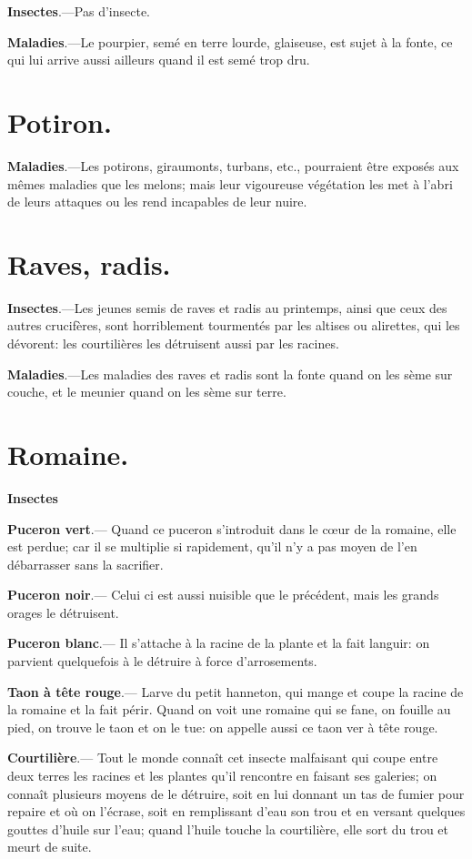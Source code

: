 \documentclass[10pt,a4paper]{book}
\begin{document}
\textbf{Insectes}.---Pas d'insecte.

\textbf{Maladies}.---Le pourpier, semé en terre lourde, glaiseuse, est sujet à la fonte, ce qui lui arrive aussi ailleurs quand il est semé trop dru.

\section{Potiron.}

\textbf{Maladies}.---Les potirons, giraumonts, turbans, etc., pourraient être exposés aux mêmes maladies que les melons; mais leur vigoureuse végétation les met à l'abri de leurs attaques ou les rend incapables de leur nuire.

\section{Raves, radis.}

\textbf{Insectes}.---Les jeunes semis de raves et radis au printemps, ainsi que ceux des autres crucifères, sont horriblement tourmentés par les altises ou alirettes, qui les dévorent: les courtilières les détruisent aussi par les racines.

\textbf{Maladies}.---Les maladies des raves et radis sont la fonte quand on les sème sur couche, et le meunier quand on les sème sur terre.

\section{Romaine.}

\textbf{Insectes}

\textbf{Puceron vert}.--- Quand ce puceron s'introduit dans le cœur de la romaine, elle est perdue; car il se multiplie si rapidement, qu'il n'y a pas moyen de l'en débarrasser sans la sacrifier.

\textbf{Puceron noir}.--- Celui ci est aussi nuisible que le précédent, mais les grands orages le détruisent.

\textbf{Puceron blanc}.--- Il s'attache à la racine de la plante et la fait languir: on parvient quelquefois à le détruire à force d'arrosements.

\textbf{Taon à tête rouge}.--- Larve du petit hanneton, qui mange et coupe la racine de la romaine et la fait périr. Quand on voit une romaine qui se fane, on fouille au pied, on trouve le taon et on le tue: on appelle aussi ce taon ver à tête rouge.

\textbf{Courtilière}.--- Tout le monde connaît cet insecte malfaisant qui coupe entre deux terres les racines et les plantes qu'il rencontre en faisant ses galeries; on connaît plusieurs moyens de le détruire, soit en lui donnant un tas de fumier pour repaire et où on l'écrase, soit en remplissant d'eau son trou et en versant quelques gouttes d'huile sur l'eau; quand l'huile touche la courtilière, elle sort du trou et meurt de suite.
\end{document}

